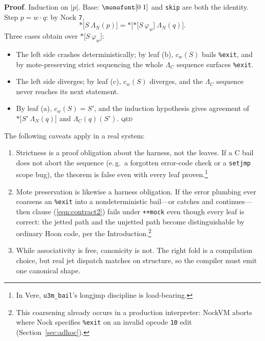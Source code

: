 \documentclass[twoside]{article}
\begin{document}
\textbf{Proof}.  Induction on $|p|$.  Base: $\texttt{[0\;1]}$ and \lstinline[style=inlinecode]{skip} are both the identity.  Step $p = w \cdot q$: by Nock \lstinline[style=inlinecode]{7},
\[
\texttt{*[}S\ \Lambda_N(p)\texttt{]} = \texttt{*[}\texttt{*[}S\ \varphi_w\texttt{]}\ \Lambda_N(q)\texttt{]}\text{.}
\]
Three cases obtain over $\texttt{*[}S\ \varphi_w\texttt{]}$:
\begin{itemize}[nosep]
  \item[$\bot_\text{det}$.]  The left side crashes deterministically; by leaf (b), $c_w(S)$ bails \lstinline[style=inlinecode]{%exit}, and by mote-preserving strict sequencing the whole $\Lambda_C$ sequence surfaces \lstinline[style=inlinecode]{%exit}.
  \item[$\Uparrow$.]  The left side diverges; by leaf (c), $c_w(S)$ diverges, and the $\Lambda_C$ sequence never reaches its next statement.
  \item[$S'$.]  By leaf (a), $c_w(S) = S'$, and the induction hypothesis gives agreement of $\texttt{*[}S'\ \Lambda_N(q)\texttt{]}$ and $\Lambda_C(q)(S')$.  \textsc{qed}
\end{itemize}

The following caveats apply in a real system:

\begin{enumerate}
  \item  Strictness is a proof obligation about the harness, not the
  leaves.  If a C bail does not abort the sequence (e.\,g.\ a forgotten
  error-code check or a \lstinline[style=inlinecode]{setjmp} scope bug), the theorem is
  false even with every leaf proven.\footnote{In Vere,
  \texttt{u3m\_bail}'s longjmp discipline is load-bearing.}
  \item  Mote preservation is likewise a harness obligation.  If the
  error plumbing ever coarsens an \lstinline[style=inlinecode]{%exit} into a
  nondeterministic bail---or catches and continues---then clause
  (\ref{eqn:contract2}) fails under \lstinline[style=inlinecode]{++mock} even though every
  leaf is correct: the jetted path and the unjetted path become
  distinguishable by ordinary Hoon code, per the Introduction.\footnote{This coarsening already occurs in a production interpreter:  NockVM aborts where Nock specifies \texttt{\%exit} on an invalid opcode \texttt{10} edit (Section~\ref{sec:adhoc}).}
  \item  While associativity is free, canonicity is not.  The right
  fold is a compilation choice, but real jet dispatch matches on
  structure, so the compiler must emit one canonical shape.
\end{enumerate}
\end{document}
